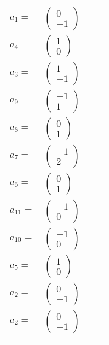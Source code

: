 \documentclass[1p]{elsarticle_modified}
\theoremstyle{definition}
\begin{document}
\begin{tabular}{m{7pt} m{180pt} m{7pt} m{180pt} }
\flushright $a_{1}=$&$\begin{pmatrix}0\\-1\end{pmatrix}$ \\
\flushright $a_{4}=$&$\begin{pmatrix}1\\0\end{pmatrix}$ \\
\flushright $a_{3}=$&$\begin{pmatrix}1\\-1\end{pmatrix}$ \\
\flushright $a_{9}=$&$\begin{pmatrix}-1\\1\end{pmatrix}$ \\
\flushright $a_{8}=$&$\begin{pmatrix}0\\1\end{pmatrix}$ \\
\flushright $a_{7}=$&$\begin{pmatrix}-1\\2\end{pmatrix}$ \\
\flushright $a_{6}=$&$\begin{pmatrix}0\\1\end{pmatrix}$ \\
\flushright $a_{11}=$&$\begin{pmatrix}-1\\0\end{pmatrix}$ \\
\flushright $a_{10}=$&$\begin{pmatrix}-1\\0\end{pmatrix}$ \\
\flushright $a_{5}=$&$\begin{pmatrix}1\\0\end{pmatrix}$ \\
\flushright $a_{2}=$&$\begin{pmatrix}0\\-1\end{pmatrix}$\\ \flushright $a_{2}=$&$\begin{pmatrix}0\\-1\end{pmatrix}$\\&\end{tabular}
\end{document}
